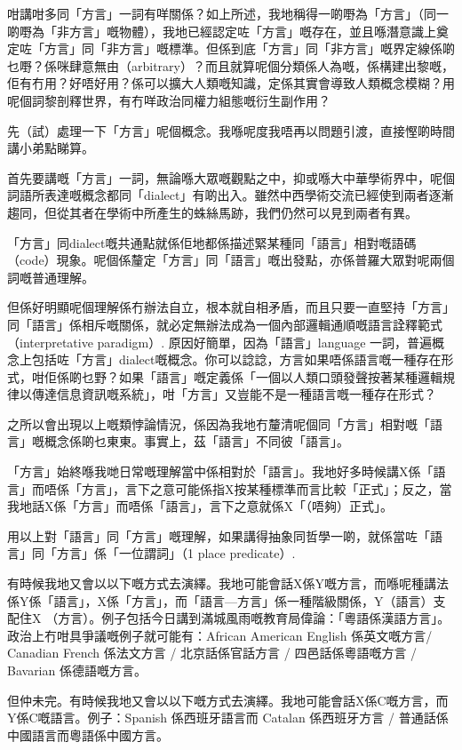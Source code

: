 咁講咁多同「方言」一詞有咩關係？如上所述，我地稱得一啲嘢為「方言」（同一啲嘢為「非方言」嘅物體），我地已經認定咗「方言」嘅存在，並且喺潛意識上奠定咗「方言」同「非方言」嘅標準。但係到底「方言」同「非方言」嘅界定線係啲乜嘢？係咪肆意無由（arbitrary）？而且就算呢個分類係人為嘅，係構建出黎嘅，佢有冇用？好唔好用？係可以擴大人類嘅知識，定係其實會導致人類概念模糊？用呢個詞黎剖釋世界，有冇咩政治同權力組態嘅衍生副作用？

先（試）處理一下「方言」呢個概念。我喺呢度我唔再以問題引渡，直接慳啲時間講小弟點睇算。

首先要講嘅「方言」一詞，無論喺大眾嘅觀點之中，抑或喺大中華學術界中，呢個詞語所表達嘅概念都同「dialect」有啲出入。雖然中西學術交流已經使到兩者逐漸趨同，但從其者在學術中所產生的蛛絲馬跡，我們仍然可以見到兩者有異。

「方言」同dialect嘅共通點就係佢地都係描述緊某種同「語言」相對嘅語碼（code）現象。呢個係釐定「方言」同「語言」嘅出發點，亦係普羅大眾對呢兩個詞嘅普通理解。

但係好明顯呢個理解係冇辦法自立，根本就自相矛盾，而且只要一直堅持「方言」同「語言」係相斥嘅關係，就必定無辦法成為一個內部邏輯通順嘅語言詮釋範式（interpretative paradigm）. 原因好簡單，因為「語言」language 一詞，普遍概念上包括咗「方言」dialect嘅概念。你可以諗諗，方言如果唔係語言嘅一種存在形式，咁佢係啲乜野？如果「語言」嘅定義係「一個以人類口頭發聲按著某種邏輯規律以傳達信息資訊嘅系統」，咁「方言」又豈能不是一種語言嘅一種存在形式？

之所以會出現以上嘅類悖論情況，係因為我地冇釐清呢個同「方言」相對嘅「語言」嘅概念係啲乜東東。事實上，茲「語言」不同彼「語言」。

「方言」始終喺我哋日常嘅理解當中係相對於「語言」。我地好多時候講X係「語言」而唔係「方言」，言下之意可能係指X按某種標準而言比較「正式」；反之，當我地話X係「方言」而唔係「語言」，言下之意就係X「（唔夠）正式」。

用以上對「語言」同「方言」嘅理解，如果講得抽象同哲學一啲，就係當咗「語言」同「方言」係「一位謂詞」（1 place predicate）.

有時候我地又會以以下嘅方式去演繹。我地可能會話X係Y嘅方言，而喺呢種講法係Y係「語言」，X係「方言」，而「語言—方言」係一種階級關係，Y（語言）支配住X （方言）。例子包括今日講到滿城風雨嘅教育局偉論：「粵語係漢語方言」。政治上冇咁具爭議嘅例子就可能有：African American English 係英文嘅方言/ Canadian French 係法文方言 / 北京話係官話方言 / 四邑話係粵語嘅方言 / Bavarian 係德語嘅方言。

但仲未完。有時候我地又會以以下嘅方式去演繹。我地可能會話X係C嘅方言，而Y係C嘅語言。例子：Spanish 係西班牙語言而 Catalan 係西班牙方言 / 普通話係中國語言而粵語係中國方言。

